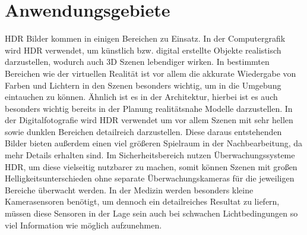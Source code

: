 \documentclass[11pt, a4paper, twocolumn]{article}
\begin{document}
	\section{Anwendungsgebiete}
	HDR Bilder kommen in einigen Bereichen zu Einsatz. In der Computergrafik wird HDR verwendet, um künstlich bzw. digital erstellte Objekte realistisch darzustellen, wodurch auch 3D Szenen lebendiger wirken. In bestimmten Bereichen wie der virtuellen Realität ist vor allem die akkurate Wiedergabe von Farben und Lichtern in den Szenen besonders wichtig, um in die Umgebung eintauchen zu können. Ähnlich ist es in der Architektur, hierbei ist es auch besonders wichtig bereits in der Planung realitätsnahe Modelle darzustellen. In der Digitalfotografie wird HDR verwendet um vor allem Szenen mit sehr hellen sowie dunklen Bereichen detailreich darzustellen. Diese daraus entstehenden Bilder bieten außerdem einen viel größeren Spielraum in der Nachbearbeitung, da mehr Details erhalten sind. Im Sicherheitsbereich nutzen Überwachungssysteme HDR, um diese vielseitig nutzbarer zu machen, somit können Szenen mit großen Helligkeitsunterschieden ohne separate Überwachungskameras für die jeweiligen Bereiche überwacht werden. In der Medizin werden besonders kleine Kamerasensoren benötigt, um dennoch ein detailreiches Resultat zu liefern, müssen diese Sensoren in der Lage sein auch bei schwachen Lichtbedingungen so viel Information wie möglich aufzunehmen.
\end{document}
